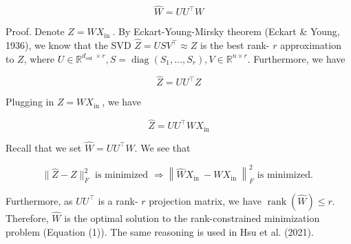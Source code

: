 \documentclass[10pt]{article}
\begin{document}
$$
\widehat{W}=U U^{\top} W
$$

Proof. Denote $Z=W X_{\text {in }}$. By Eckart-Young-Mirsky theorem (Eckart \& Young, 1936), we know that the SVD $\widehat{Z}= U S V^{\top} \approx Z$ is the best rank- $r$ approximation to $Z$, where $U \in \mathbb{R}^{d_{\text {out }} \times r}, S=\operatorname{diag}\left(S_{1}, \ldots, S_{r}\right), V \in \mathbb{R}^{n \times r}$. Furthermore, we have

$$
\widehat{Z}=U U^{\top} Z
$$

Plugging in $Z=W X_{\text {in }}$, we have

$$
\widehat{Z}=U U^{\top} W X_{\mathrm{in}}
$$

Recall that we set $\widehat{W}=U U^{\top} W$. We see that

$$
\|\widehat{Z}-Z\|_{F}^{2} \text { is minimized } \Rightarrow\left\|\widehat{W} X_{\text {in }}-W X_{\text {in }}\right\|_{F}^{2} \text { is minimized. }
$$

Furthermore, as $U U^{\top}$ is a rank- $r$ projection matrix, we have $\operatorname{rank}(\widehat{W}) \leq r$. Therefore, $\widehat{W}$ is the optimal solution to the rank-constrained minimization problem (Equation (1)). The same reasoning is used in Hsu et al. (2021).
\end{document}
